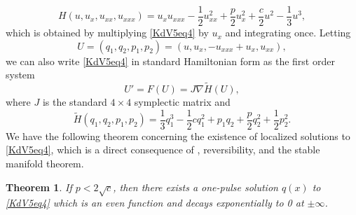 \documentclass[10pt,reqno]{amsart}
\theoremstyle{plain}
\newtheorem{theorem}{Theorem}
\theoremstyle{definition}
\theoremstyle{remark}
\numberwithin{theorem}{section}
\numberwithin{equation}{section}
\begin{document}
\begin{equation}\label{KdV5ham}
H(u, u_x, u_{xx}, u_{xxx}) = u_x u_{xxx} - \frac{1}{2}u_{xx}^2 + \frac{p}{2}u_x^2 + \frac{c}{2}u^2 - \frac{1}{3}u^3,
\end{equation}
which is obtained by multiplying \cref{KdV5eq4} by $u_x$ and integrating once. Letting
\begin{equation}\label{KdV5U}
U = (q_1, q_2, p_1, p_2) = (u, u_x, -u_{xxx} + u_x, u_{xx}),
\end{equation}
we can also write \cref{KdV5eq4} in standard Hamiltonian form as the first order system
\begin{equation}\label{KdV5ham2}
U' = F(U) = J \nabla \tilde{H}(U),
\end{equation}
where $J$ is the standard $4 \times 4$ symplectic matrix and
\begin{equation}
\tilde{H}(q_1, q_2, p_1, p_2) = \frac{1}{3}q_1^3 - \frac{1}{2}c q_1^2 + p_1 q_2 + \frac{p}{2}q_2^2 + \frac{1}{2}p_2^2.
\end{equation}
We have the following theorem concerning the existence of localized solutions to \cref{KdV5eq4}, which is a direct consequence of \cite{Groves1998}, reversibility, and the stable manifold theorem.

\begin{theorem}\label{KdV1pulse}
If $p < 2 \sqrt{c}$, then there exists a one-pulse solution $q(x)$ to \cref{KdV5eq4} which is an even function and decays exponentially to 0 at $\pm \infty$.
\end{theorem}
\end{document}
